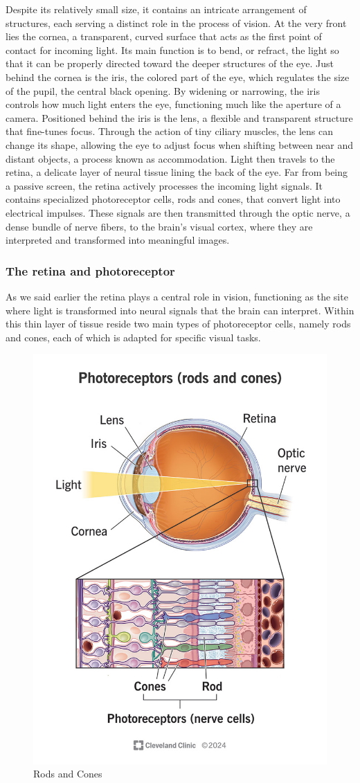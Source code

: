 \documentclass{article}
\begin{document}
Despite its relatively small size, it contains an intricate arrangement of structures, each serving a distinct role in the process of vision.
At the very front lies the cornea, a transparent, curved surface that acts as the first point of contact for incoming light. 
Its main function is to bend, or refract, the light so that it can be properly directed toward the deeper structures of the eye.
Just behind the cornea is the iris, the colored part of the eye, which regulates the size of the pupil, the central black opening. 
By widening or narrowing, the iris controls how much light enters the eye, functioning much like the aperture of a camera.
Positioned behind the iris is the lens, a flexible and transparent structure that fine-tunes focus. 
Through the action of tiny ciliary muscles, the lens can change its shape, allowing the eye to adjust focus when shifting between near and distant objects, a process known as accommodation.
Light then travels to the retina, a delicate layer of neural tissue lining the back of the eye. 
Far from being a passive screen, the retina actively processes the incoming light signals. 
It contains specialized photoreceptor cells, rods and cones, that convert light into electrical impulses. 
These signals are then transmitted through the optic nerve, a dense bundle of nerve fibers, to the brain's visual cortex, where they are interpreted and transformed into meaningful images.

\subsubsection{The retina and photoreceptor}

As we said earlier the retina plays a central role in vision, functioning as the site where light is transformed into neural signals that the brain can interpret. 
Within this thin layer of tissue reside two main types of photoreceptor cells, namely rods and cones, each of which is adapted for specific visual tasks.

\begin{figure}[ht]
    \centering
    \includegraphics[width = 0.4
    \textwidth]{Images/Theory/rods_cones.jpg}
    \caption{Rods and Cones}
    \label{fig:rodscones}
\end{figure}
\end{document}
